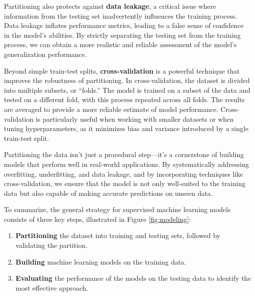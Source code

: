\documentclass[
]{book}
\providecommand{\tightlist}{%
  \setlength{\itemsep}{0pt}\setlength{\parskip}{0pt}}
\theoremstyle{definition}
\theoremstyle{definition}
\theoremstyle{definition}
\theoremstyle{definition}
\theoremstyle{remark}
\begin{document}
Partitioning also protects against \textbf{data leakage}, a critical issue where information from the testing set inadvertently influences the training process. Data leakage inflates performance metrics, leading to a false sense of confidence in the model's abilities. By strictly separating the testing set from the training process, we can obtain a more realistic and reliable assessment of the model's generalization performance.

Beyond simple train-test splits, \textbf{cross-validation} is a powerful technique that improves the robustness of partitioning. In cross-validation, the dataset is divided into multiple subsets, or ``folds.'' The model is trained on a subset of the data and tested on a different fold, with this process repeated across all folds. The results are averaged to provide a more reliable estimate of model performance. Cross-validation is particularly useful when working with smaller datasets or when tuning hyperparameters, as it minimizes bias and variance introduced by a single train-test split.

Partitioning the data isn't just a procedural step---it's a cornerstone of building models that perform well in real-world applications. By systematically addressing overfitting, underfitting, and data leakage, and by incorporating techniques like cross-validation, we ensure that the model is not only well-suited to the training data but also capable of making accurate predictions on unseen data.

To summarize, the general strategy for supervised machine learning models consists of three key steps, illustrated in Figure \ref{fig:modeling}:

\begin{enumerate}
\def\labelenumi{\arabic{enumi}.}
\tightlist
\item
  \textbf{Partitioning} the dataset into training and testing sets, followed by validating the partition.\\
\item
  \textbf{Building} machine learning models on the training data.\\
\item
  \textbf{Evaluating} the performance of the models on the testing data to identify the most effective approach.
\end{enumerate}
\end{document}
